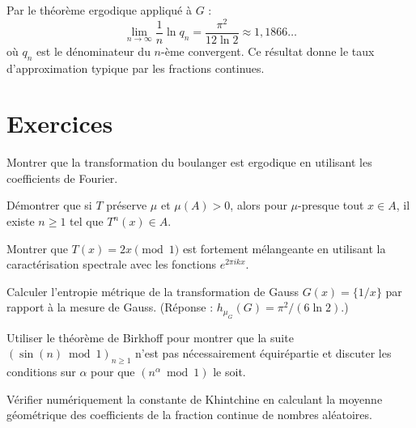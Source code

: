\begin{exemple}
Par le th\'eor\`eme ergodique appliqu\'e \`a $G$ :
\[
    \lim_{n \to \infty} \frac{1}{n} \ln q_n = \frac{\pi^2}{12 \ln 2}
    \approx 1{,}1866\ldots
\]
o\`u $q_n$ est le d\'enominateur du $n$-\`eme convergent. Ce r\'esultat
donne le taux d'approximation typique par les fractions continues.
\end{exemple}

\section{Exercices}

\begin{exercice}[Ergodicit\'e]
Montrer que la transformation du boulanger est ergodique en utilisant les
coefficients de Fourier.
\end{exercice}

\begin{exercice}
D\'emontrer que si $T$ pr\'eserve $\mu$ et $\mu(A) > 0$, alors pour
$\mu$-presque tout $x \in A$, il existe $n \geq 1$ tel que $T^n(x) \in A$.
\end{exercice}

\begin{exercice}
Montrer que $T(x) = 2x \pmod{1}$ est fortement m\'elangeante en utilisant
la caract\'erisation spectrale avec les fonctions $e^{2\pi i k x}$.
\end{exercice}

\begin{exercice}[Entropie]
Calculer l'entropie m\'etrique de la transformation de Gauss $G(x) = \{1/x\}$
par rapport \`a la mesure de Gauss. (R\'eponse : $h_{\mu_G}(G) = \pi^2/(6\ln 2)$.)
\end{exercice}

\begin{exercice}
Utiliser le th\'eor\`eme de Birkhoff pour montrer que la suite
$(\sin(n) \bmod 1)_{n \geq 1}$ n'est pas n\'ecessairement \'equir\'epartie
et discuter les conditions sur $\alpha$ pour que $(n^\alpha \bmod 1)$ le soit.
\end{exercice}

\begin{exercice}
V\'erifier num\'eriquement la constante de Khintchine en calculant la moyenne
g\'eom\'etrique des coefficients de la fraction continue de nombres al\'eatoires.
\end{exercice}
